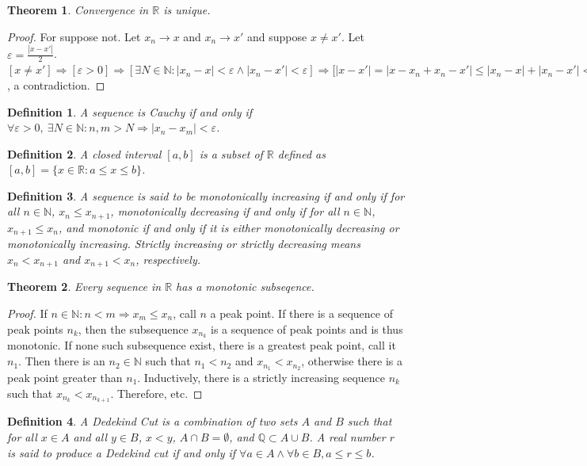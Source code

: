 \documentclass[oneside]{book}
\theoremstyle{mystyle}
\newtheorem{theorem}{Theorem}[section]
\newtheorem{definition}{Definition}[section]
\begin{document}
\begin{theorem}
Convergence in $\mathbb{R}$ is unique.
\end{theorem}
\begin{proof}
For suppose not. Let $x_n \rightarrow x$ and $x_n \rightarrow x'$ and suppose $x\ne x'$. Let $\varepsilon = \frac{|x-x'|}{2}$. $[x\ne x']\Rightarrow [\varepsilon>0]\Rightarrow [\exists N\in\mathbb{N}:|x_n-x|<\varepsilon\land |x_n-x'| <\varepsilon]\Rightarrow \big[|x-x'|=|x-x_n+x_n-x'|\leq |x_n-x|+|x_n-x'|<2\varepsilon = |x-x'|\big]$, a contradiction.
\end{proof}

\begin{definition}
A sequence is Cauchy if and only if $\forall \varepsilon>0,\ \exists N\in \mathbb{N}: n,m>N\Rightarrow |x_n-x_m|<\varepsilon$.
\end{definition}

\begin{definition}
A closed interval $[a,b]$ is a subset of $\mathbb{R}$ defined as $[a,b] = \{x\in\mathbb{R}:a\leq x\leq b\}$. 
\end{definition}

\begin{definition}
A sequence is said to be monotonically increasing if and only if for all $n\in \mathbb{N}$, $x_n \leq x_{n+1}$, monotonically decreasing if and only if for all $n\in \mathbb{N}$, $x_{n+1} \leq x_{n}$, and monotonic if and only if it is either monotonically decreasing or monotonically increasing. Strictly increasing or strictly decreasing means $x_{n}<x_{n+1}$ and $x_{n+1}<x_n$, respectively.
\end{definition}

\begin{theorem}
Every sequence in $\mathbb{R}$ has a monotonic subseqence.
\end{theorem}
\begin{proof}
If $n\in \mathbb{N}:n<m\Rightarrow x_m \leq x_n$, call $n$ a peak point. If there is a sequence of peak points $n_k$, then the subsequence $x_{n_k}$ is a sequence of peak points and is thus monotonic. If none such subsequence exist, there is a greatest peak point, call it $n_1$. Then there is an $n_2\in \mathbb{N}$ such that $n_1 < n_2$ and $x_{n_1}< x_{n_2}$, otherwise there is a peak point greater than $n_1$. Inductively, there is a strictly increasing sequence $n_k$ such that $x_{n_k}< x_{n_{k+1}}$. Therefore, etc.
\end{proof}

\begin{definition}
A Dedekind Cut is a combination of two sets $A$ and $B$ such that for all $x\in A$ and all $y\in B$, $x< y$, $A\cap B=\emptyset$, and $\mathbb{Q} \subset A\cup B$. A real number $r$ is said to produce a Dedekind cut if and only if $\forall a\in A\land \forall b\in B, a\leq r\leq b$.
\end{definition}
\end{document}
